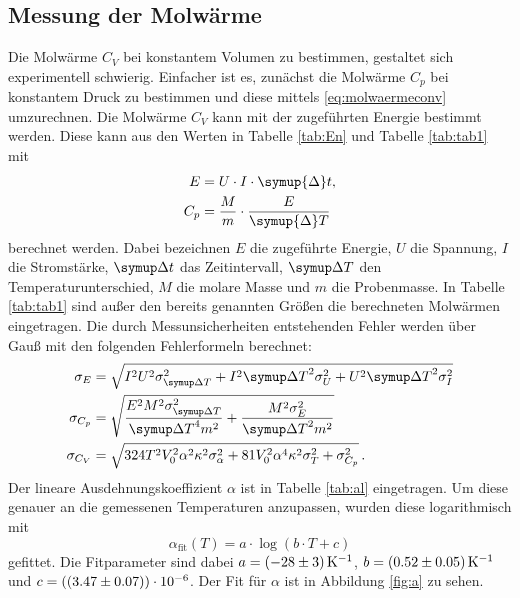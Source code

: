 \subsection{Messung der Molwärme}
Die Molwärme $C_V$ bei konstantem Volumen zu bestimmen, gestaltet sich experimentell schwierig. Einfacher ist es, zunächst die Molwärme $C_p$ bei konstantem Druck zu bestimmen und diese mittels \eqref{eq:molwaermeconv}
umzurechnen. 
Die Molwärme $C_V$ kann mit der zugeführten Energie bestimmt werden. Diese kann aus den Werten in Tabelle \ref{tab:En} und Tabelle \ref{tab:tab1} mit
\begin{align}
	E &= U \cdot I \cdot \symup{\Delta} t,\\
	C_p &= \frac{M}{m}\cdot\frac{E}{\symup{\Delta} T}
	\label{eqn:cp}
\end{align}
berechnet werden. Dabei bezeichnen $E$ die zugeführte Energie, $U$ die Spannung, $I$ die Stromstärke, $\symup\Delta t$ das Zeitintervall, $\symup\Delta T$ den Temperaturunterschied, $M$ die molare Masse und $m$ die Probenmasse. In Tabelle \ref{tab:tab1} sind außer den bereits genannten Größen die berechneten Molwärmen eingetragen.
Die durch Messunsicherheiten entstehenden Fehler werden über Gauß mit den folgenden Fehlerformeln berechnet:
\begin{align*}
	\sigma_E &= \sqrt{I^{2} U^{2} \sigma_{{\symup\Delta T}}^{2} + I^{2} {\symup\Delta T}^{2} \sigma_{U}^{2} + U^{2} {\symup\Delta T}^{2} \sigma_{I}^{2}}\\
	\sigma_{C_p} &= \sqrt{\frac{E^{2} M^{2} \sigma_{{\symup\Delta T}}^{2}}{{\symup\Delta T}^{4} m^{2}} +\frac{M^{2} \sigma_{E}^{2}}{{\symup\Delta T}^{2} m^{2}}}\\
	\sigma_{C_V} &= \sqrt{324 T^{2} V_{0}^{2} \alpha^{2} \kappa^{2} \sigma_{\alpha}^{2} + 81 V_{0}^{2} \alpha^{4} \kappa^{2} \sigma_{T}^{2} + \sigma_{C_{p}}^{2}}\,\text.
\end{align*}
Der lineare Ausdehnungskoeffizient $\alpha$ ist in Tabelle \ref{tab:al} eingetragen. Um diese genauer an die gemessenen Temperaturen anzupassen, wurden diese logarithmisch mit
\begin{equation*}
	\alpha_\text{fit}(T) = a\cdot\log{(b\cdot T + c)}
\end{equation*}
gefittet. Die Fitparameter sind dabei $a = \SI{-28 \pm 3}{\per\kelvin}$, $b = \SI{0.52\pm0.05}{\per\kelvin}$ und $c = (\SI{3.47\pm0.07}{})\cdot 10^{-6}$.
Der Fit für $\alpha$ ist in Abbildung \ref{fig:a} zu sehen.
